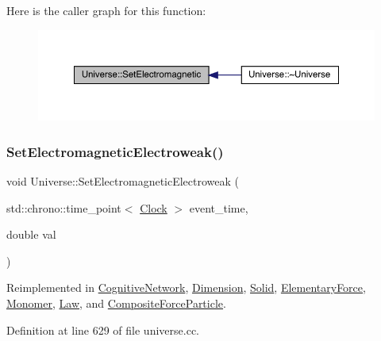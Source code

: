 Here is the caller graph for this function\+:
\nopagebreak
\begin{figure}[H]
\begin{center}
\leavevmode
\includegraphics[width=350pt]{class_universe_aa981fc7e252b1fbbb675f0371860954d_icgraph}
\end{center}
\end{figure}
\mbox{\label{class_universe_a608aa95698380f791a0ffba45cc1bee3}} 
\subsubsection{\texorpdfstring{Set\+Electromagnetic\+Electroweak()}{SetElectromagneticElectroweak()}}
{\footnotesize\ttfamily void Universe\+::\+Set\+Electromagnetic\+Electroweak (\begin{DoxyParamCaption}\item[{std\+::chrono\+::time\+\_\+point$<$ \hyperlink{universe_8h_a0ef8d951d1ca5ab3cfaf7ab4c7a6fd80}{Clock} $>$}]{event\+\_\+time,  }\item[{double}]{val }\end{DoxyParamCaption})\hspace{0.3cm}{\ttfamily [virtual]}}



Reimplemented in \hyperlink{class_cognitive_network_a270f6842ec14b3e5b80dedf7b48ea6f4}{Cognitive\+Network}, \hyperlink{class_dimension_aead73fc6a25388d14b514b2170735b1b}{Dimension}, \hyperlink{class_solid_a6617ae9fe4707d760a23b54eddf00dec}{Solid}, \hyperlink{class_elementary_force_af4f12038c33d7edf9f13339fcd632ec9}{Elementary\+Force}, \hyperlink{class_monomer_aa034728b74053ed3df452ddc8f1b46e8}{Monomer}, \hyperlink{class_law_aca9bb82839ddb46bd89f52b6211c5a54}{Law}, and \hyperlink{class_composite_force_particle_ad53c5d396b3c56241174a9bd78f9e07a}{Composite\+Force\+Particle}.



Definition at line 629 of file universe.\+cc.

